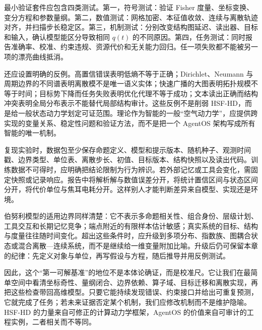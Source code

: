 最小验证套件应包含四类测试。第一，符号测试：验证 Fisher 度量、坐标变换、变分方程和参数量纲。第二，数值测试：网格加密、本征值收敛、连续与离散轨迹对齐，并扫描步长稳定区。第三，机制测试：分别改变结构图延迟、读出器、目标和输入，确认模型能区分导致相同 $q(t)$ 的不同原因。第四，任务测试：同时报告准确率、校准、约束违规、资源代价和无关能力回归。任一项失败都不能被另一项的漂亮曲线抵消。

还应设置明确的反例。高置信错误表明低熵不等于正确；Dirichlet、Neumann 与周期边界的不同谱表明离散模不是唯一语义实体；快速广播的大图表明拓扑规模不等于时间；目标势下降而任务失败表明优化代理不等于成功；文本读出正确而结构冲突表明全局分布表示不能替代局部结构审计。这些反例不是削弱 HSF-HD，而是给一般状态动力学划定可证范围。理论作为智能的一般“空气动力学”，应提供跨实现的变量关系、稳定性问题和验证方法，而不是把一个 AgentOS 架构写成所有智能的唯一机制。

复现实验时，数据包至少保存命题定义、模型和提示版本、随机种子、观测时间戳、边界类型、单位表、离散步长、初值、目标版本、结构快照以及读出代码。训练数据不可得时，应明确把结论限制为行为辨识。若外部记忆或工具会变化，需固定快照或记录响应。报告中将解析解与数值误差分开，将统计置信区间与状态区间分开，将代价单位与焦耳电耗分开。这样别人才能判断差异来自模型、实现还是环境。

伯努利模型的适用边界同样清楚：它不表示多命题相关性、组合身份、层级计划、工具交互和长期记忆竞争；端点附近的有限样本估计敏感；真实系统的目标、结构与度量往往随时间变化。超出这些条件时，应升级到多项分布、指数族、图耦合状态或混合离散—连续系统，而不是继续给一维变量附加比喻。升级后仍可保留本章的纪律：先定义对象与单位，再写假设与方程，随后推导并用反例测试。

因此，这个“第一可解基准”的地位不是本体论确证，而是校准尺。它让我们在最简单空间中看清坐标奇性、量纲闭合、边界依赖、算子域、目标迁移和离散实现，再把这些检查带回高维模型。只要它能持续发现错误、约束接口并给出可重复预测，它就完成了任务；若未来证据否定某个机制，我们应修改机制而不是维护隐喻。HSF-HD 的力量来自可修正的计算动力学框架，AgentOS 的价值来自可审计的工程实例，二者相关而不等同。
